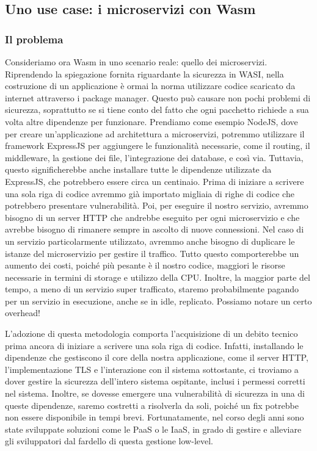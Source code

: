 \subsection{Uno use case: i microservizi con Wasm}
\subsubsection{Il problema}
Consideriamo ora Wasm in uno scenario reale: quello dei microservizi\cite{a-way-to-rethink-microservices}. Riprendendo
la spiegazione fornita riguardante la sicurezza in WASI, nella costruzione di un applicazione è ormai la norma
utilizzare codice scaricato da internet attraverso i package manager. Questo può causare non pochi problemi di
sicurezza, soprattutto se si tiene conto del fatto che ogni pacchetto richiede a sua volta altre dipendenze per
funzionare. Prendiamo come esempio NodeJS, dove per creare un'applicazione ad architettura a microservizi, potremmo
utilizzare il framework ExpressJS per aggiungere le funzionalità necessarie, come il routing, il middleware, la gestione
dei file, l'integrazione dei database, e così via. Tuttavia, questo significherebbe anche installare tutte le dipendenze
utilizzate da ExpressJS, che potrebbero essere circa un centinaio. Prima di iniziare a scrivere una sola riga di codice
avremmo già importato migliaia di righe di codice che potrebbero presentare vulnerabilità. Poi, per eseguire il nostro
servizio, avremmo bisogno di un server HTTP che andrebbe eseguito per ogni microservizio e che avrebbe bisogno di
rimanere sempre in ascolto di nuove connessioni. Nel caso di un servizio particolarmente utilizzato, avremmo anche
bisogno di duplicare le istanze del microservizio per gestire il traffico. Tutto questo comporterebbe un aumento dei
costi, poiché più pesante è il nostro codice, maggiori le risorse necessarie in termini di storage e utilizzo della CPU.
Inoltre, la maggior parte del tempo, a meno di un servizio super trafficato, staremo probabilmente pagando per un
servizio in esecuzione, anche se in idle, replicato. Possiamo notare un certo overhead!

L'adozione di questa metodologia comporta l'acquisizione di un debito tecnico prima ancora di iniziare a scrivere una
sola riga di codice. Infatti, installando le dipendenze che gestiscono il core della nostra applicazione, come il server
HTTP, l'implementazione TLS e l'interazione con il sistema sottostante, ci troviamo a dover gestire la sicurezza
dell'intero sistema ospitante, inclusi i permessi corretti nel sistema. Inoltre, se dovesse emergere una vulnerabilità
di sicurezza in una di queste dipendenze, saremo costretti a risolverla da soli, poiché un fix potrebbe non essere
disponibile in tempi brevi. Fortunatamente, nel corso degli anni sono state sviluppate soluzioni come le PaaS o le IaaS,
in grado di gestire e alleviare gli sviluppatori dal fardello di questa gestione low-level.

